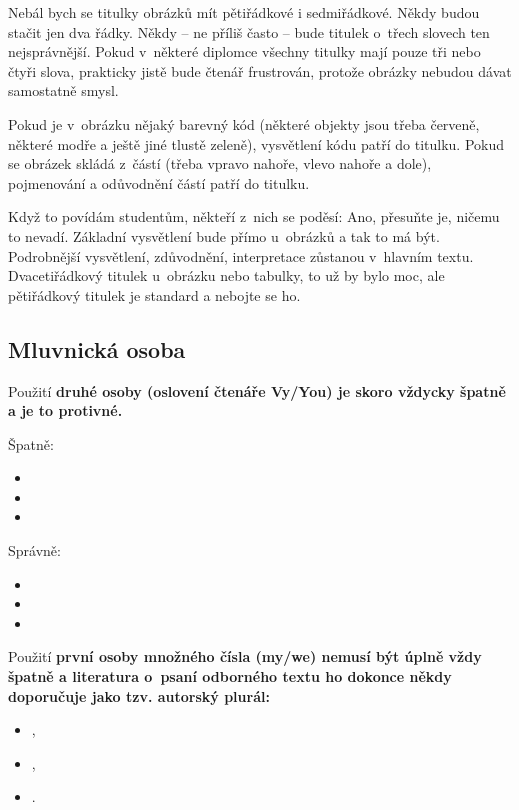 Nebál bych se titulky obrázků mít pětiřádkové i sedmiřádkové. Někdy budou stačit jen dva řádky. Někdy -- ne příliš často -- bude titulek o~třech slovech ten nejsprávnější. Pokud v~některé diplomce všechny titulky mají pouze tři nebo čtyři slova, prakticky jistě bude čtenář frustrován, protože obrázky nebudou dávat samostatně smysl.

Pokud je v~obrázku nějaký barevný kód (některé objekty jsou třeba červeně, některé modře a ještě jiné tlustě zeleně), vysvětlení kódu patří do titulku. Pokud se obrázek skládá z~částí (třeba vpravo nahoře, vlevo nahoře a dole), pojmenování a odůvodnění částí patří do titulku.

Když to povídám studentům, někteří z~nich se poděsí:  Ano, přesuňte je, ničemu to nevadí. Základní vysvětlení bude přímo u~obrázků a tak to má být. Podrobnější vysvětlení, zdůvodnění, interpretace zůstanou v~hlavním textu. Dvacetiřádkový titulek u~obrázku nebo tabulky, to už by bylo moc, ale pětiřádkový titulek je standard a nebojte se ho.

\subsection*{Mluvnická osoba}

Použití \bf druhé osoby \rm (oslovení čtenáře Vy/You) je skoro vždycky špatně a je to protivné.

Špatně:
\begin{itemize}
  \item{}
  \item{}
  \item{}
\end{itemize}

Správně:
\begin{itemize}
  \item{}
  \item{}
  \item{}
\end{itemize}

Použití \bf první osoby množného čísla \rm (my/we) nemusí být úplně vždy špatně a  literatura o~psaní odborného textu ho dokonce někdy doporučuje jako tzv. autorský plurál:
\begin{itemize}
  \item{},
  \item{},
  \item{}.
\end{itemize}

